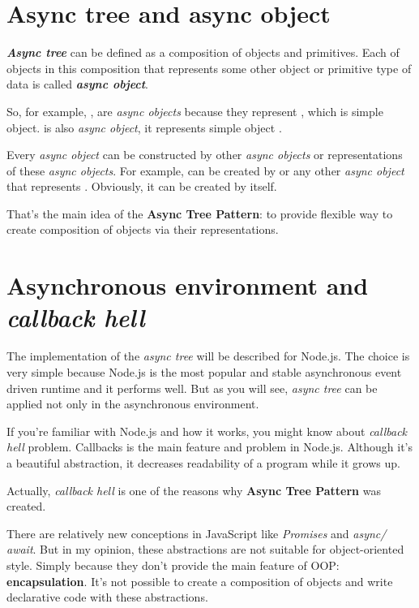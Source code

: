 \documentclass{article}
\newcommand{\cit}[1]{{\fontfamily{qcr}\selectfont{\textit{\textcolor{superdarkgray}{#1}}}}}
\newcommand{\bit}[1]{\textit{\textbf{#1}}}
\begin{document}
\section{Async tree and async object}

\bit{Async tree} can be defined as a composition of objects and primitives. Each of objects in this composition that represents some other object or primitive type of data is called \bit{async object}. 

So, for example, \cit{SavedAccount}, \cit{CreatedAccount} are \textit{async objects} because they represent \cit{Account}, which is simple object. \cit{UserFromDb} is also \textit{async object}, it represents simple object \cit{User}.

Every \textit{async object} can be constructed by other \textit{async objects} or representations of these \textit{async objects}. For example, \cit{SavedAccount} can be created by \cit{CreatedAccount} or any other \textit{async object} that represents \cit{Account}. Obviously, it can be created by \cit{Account} itself.

That's the main idea of the \textbf{Async Tree Pattern}: to provide flexible way to create composition of objects via their representations.

\section{Asynchronous environment and \textit{callback hell}}

The implementation of the \textit{async tree} will be described for Node.js. The choice is very simple because Node.js is the most popular and stable asynchronous  event driven runtime and it performs well. But as you will see, \textit{async tree} can be applied not only in the asynchronous environment.

If you're familiar with Node.js and how it works, you might know about \textit{callback hell} problem. Callbacks is the main feature and problem in Node.js. Although it's a beautiful abstraction, it decreases readability of a program while it grows up.

Actually, \textit{callback hell} is one of the reasons why \textbf{Async Tree Pattern} was created.

There are relatively new conceptions in JavaScript like \textit{Promises} and  \textit{async/ await}. But in my opinion, these abstractions are not suitable for object-oriented style. Simply because they don't provide the main feature of OOP: \textbf{encapsulation}. 
It's not possible to create a composition of objects and write declarative code with these abstractions.
\end{document}
